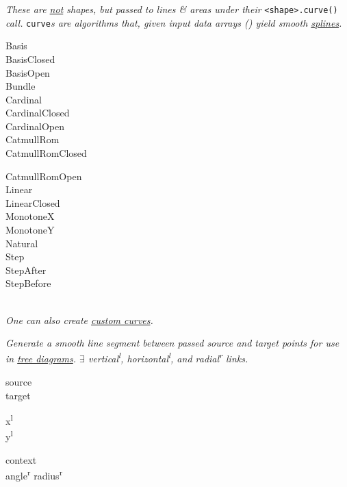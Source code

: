 \textit{These are \underline{not} shapes, but passed to lines \& areas under their }\texttt{<shape>.curve()}\textit{ call. }\texttt{curve}\textit{s are algorithms that, given input data arrays () yield smooth \href{https://en.wikipedia.org/wiki/Spline\_interpolation}{splines}.}
{\footnotesize
\begin{minipage}[t]{3.0cm}
    Basis\\
    BasisClosed\\
    BasisOpen\\
    Bundle\\
    Cardinal\\
    CardinalClosed\\
    CardinalOpen\\
    CatmullRom\\
    CatmullRomClosed
\end{minipage}
\begin{minipage}[t]{3.0cm}
    CatmullRomOpen\\
    Linear\\
    LinearClosed\\
    MonotoneX\\
    MonotoneY\\
    Natural\\
    Step\\
    StepAfter\\
    StepBefore
\end{minipage}
}
\\


\textit{One can also create \href{https://github.com/d3/d3-shape\#custom-curves}{custom curves}.}


\textit{Generate a smooth line segment between passed source and target points for use in \href{https://observablehq.com/@d3/tidy-tree}{tree diagrams}. $\exists$ vertical\textsuperscript{l}, horizontal\textsuperscript{l}, and radial\textsuperscript{r} links.}

{\footnotesize
\begin{minipage}[t]{2.0cm}
    source\\
    target\\
\end{minipage}
\begin{minipage}[t]{2.0cm}
    x\textsuperscript{l}\\
    y\textsuperscript{l}
\end{minipage}
\begin{minipage}[t]{2.0cm}
    context\\
    angle\textsuperscript{r}
    radius\textsuperscript{r}
\end{minipage}
}
\\


